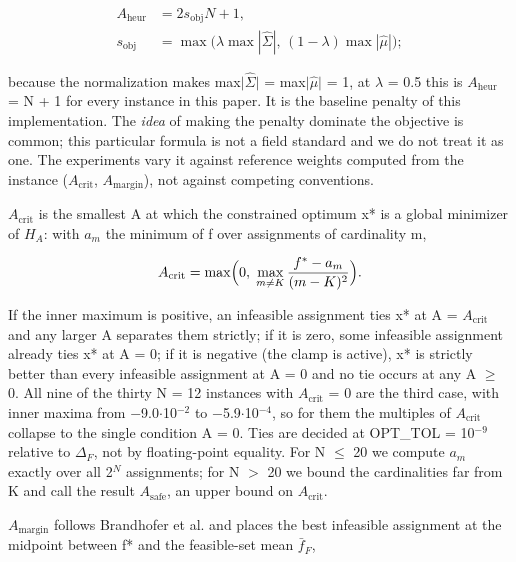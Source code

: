 \documentclass{ieeeaccess}
\begin{document}
\begin{equation*}
\begin{aligned} A_{\mathrm{heur}} &= 2 s_{\mathrm{obj}} N + 1,\\ s_{\mathrm{obj}} &= \max\bigl(\lambda \max|\hat{\Sigma}|,\, (1-\lambda)\max|\hat{\mu}|\bigr);\end{aligned}
\end{equation*}


because the normalization makes max$|$$\hat{\Sigma}$$|$ = max$|$$\hat{\mu}$$|$ = 1, at $\lambda$ = 0.5 this is $A_{\mathrm{heur}}$ = N + 1 for every instance in this paper. It is the baseline penalty of this implementation. The \textit{idea} of making the penalty dominate the objective is common; this particular formula is not a field standard and we do not treat it as one. The experiments vary it against reference weights computed from the instance ($A_{\mathrm{crit}}$, $A_{\mathrm{margin}}$), not against competing conventions.


$A_{\mathrm{crit}}$ is the smallest A at which the constrained optimum x* is a global minimizer of $H_{A}$: with $a_{m}$ the minimum of f over assignments of cardinality m,


\begin{equation*}
A_{\mathrm{crit}} = \max\Bigl(0,\; \max_{m \neq K} \frac{f^{*} - a_m}{(m-K)^2}\Bigr).
\end{equation*}


If the inner maximum is positive, an infeasible assignment ties x* at A = $A_{\mathrm{crit}}$ and any larger A separates them strictly; if it is zero, some infeasible assignment already ties x* at A = 0; if it is negative (the clamp is active), x* is strictly better than every infeasible assignment at A = 0 and no tie occurs at any A $\geq$ 0. All nine of the thirty N = 12 instances with $A_{\mathrm{crit}}$ = 0 are the third case, with inner maxima from $-$9.0$\cdot$10$^{-2}$ to $-$5.9$\cdot$10$^{-4}$, so for them the multiples of $A_{\mathrm{crit}}$ collapse to the single condition A = 0. Ties are decided at OPT\_TOL = 10$^{-9}$ relative to $\Delta_{F}$, not by floating-point equality. For N $\leq$ 20 we compute $a_{m}$ exactly over all 2$^{N}$ assignments; for N $>$ 20 we bound the cardinalities far from K and call the result $A_{\mathrm{safe}}$, an upper bound on $A_{\mathrm{crit}}$.


$A_{\mathrm{margin}}$ follows Brandhofer et al. \cite{ref9} and places the best infeasible assignment at the midpoint between f* and the feasible-set mean $\bar{f}_{F}$,
\end{document}
